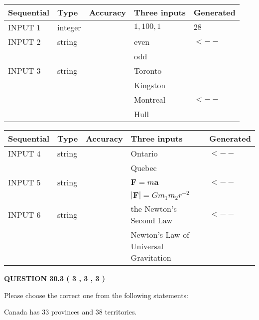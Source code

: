 \documentclass[12pt]{article}
\begin{document}
   
  
  
\noindent\begin{tabular}{|l|l|l|l|l|}
\hline
 Sequential & Type & Accuracy & Three inputs & Generated \\ 
\hline
 
 
  INPUT $            1 $ & integer &  & $
 1
 , 
 100
 , 
 1
 $ & $ 28 $ 
 \\  \hline  
 
 
  INPUT $            2 $ & string & & 
 even & 
  $ <-- $ 
  \\
  & & & 
 odd & 
 \\  \hline  
 
 
  INPUT $            3 $ & string & & 
 Toronto & 
  \\
  & & & 
 Kingston & 
  \\
  & & & 
 Montreal & 
  $ <-- $ 
  \\
  & & & 
 Hull & 
 \\  \hline  
 \end{tabular}
   
   
  
  
\noindent\begin{tabular}{|l|l|l|l|l|}
\hline
 Sequential & Type & Accuracy & Three inputs & Generated \\ 
\hline
 
 
  INPUT $            4 $ & string & & 
 Ontario & 
  $ <-- $ 
  \\
  & & & 
 Quebec & 
 \\  \hline  
 
 
  INPUT $            5 $ & string & & 
 $\mathbf{F}=m\mathbf{a}$ & 
  $ <-- $ 
  \\
  & & & 
 $\left| \mathbf{F}\right| =Gm_1m_2r^{-2}$ & 
 \\  \hline  
 
 
  INPUT $            6 $ & string & & 
 the Newton's Second Law & 
  $ <-- $ 
  \\
  & & & 
 Newton's Law of Universal Gravitation & 
 \\  \hline  
 \end{tabular}
   
   
  
\vspace{0.2in}
  
{\textbf{\Large{QUESTION
30.3 
 (           3 ,           3 ,           3 )
}}}
  
  
Please choose the correct one from the following statements:
 
 
Canada has  %
33 provinces and  %
38 territories.
 
\end{document}
